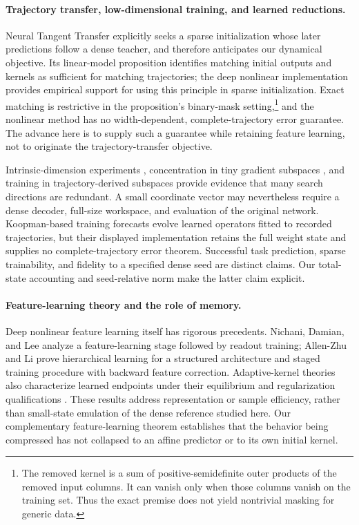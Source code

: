 \documentclass[11pt]{article}
\theoremstyle{definition}
\theoremstyle{remark}
\begin{document}
\paragraph{Trajectory transfer, low-dimensional training, and learned reductions.}
Neural Tangent Transfer \cite{liu2020transfer} explicitly seeks a sparse
initialization whose later predictions follow a dense teacher, and therefore
anticipates our dynamical objective. Its linear-model proposition identifies
matching initial outputs and kernels as sufficient for matching trajectories;
the deep nonlinear implementation provides empirical support for using this
principle in sparse initialization. Exact matching is restrictive in the
proposition's binary-mask setting,\footnote{The removed kernel is a sum of
positive-semidefinite outer products of the removed input columns. It can
vanish only when those columns vanish on the training set. Thus the exact
premise does not yield nontrivial masking for generic data.}
and the nonlinear method has no width-dependent, complete-trajectory
error guarantee. The advance here is to supply such a guarantee while
retaining feature learning, not to originate the trajectory-transfer objective.

Intrinsic-dimension experiments \cite{li2018intrinsic}, concentration in
tiny gradient subspaces \cite{gurari2018gradient}, and training in
trajectory-derived subspaces \cite{li2023trajectory} provide evidence
that many search directions are redundant. A small coordinate vector may
nevertheless require a dense decoder, full-size workspace, and evaluation of
the original network. Koopman-based training forecasts
\cite{dogra2020koopman} evolve learned operators fitted to recorded
trajectories, but their displayed implementation retains the full weight
state and supplies no complete-trajectory error theorem.
Successful task prediction, sparse trainability, and fidelity to a specified
dense seed are distinct claims. Our total-state accounting and seed-relative
norm make the latter claim explicit.

\paragraph{Feature-learning theory and the role of memory.}
Deep nonlinear feature learning itself has rigorous precedents.
Nichani, Damian, and Lee \cite{nichani2023nonlinear} analyze a
feature-learning stage followed by readout training; Allen-Zhu and Li
\cite{allenzhu2023backward} prove hierarchical learning for a structured
architecture and staged training procedure with backward feature correction.
Adaptive-kernel theories also characterize learned endpoints under their
equilibrium and regularization qualifications \cite{lauditi2025adaptive}.
These results address representation or sample efficiency, rather than
small-state emulation of the dense reference studied here. Our complementary
feature-learning theorem establishes that the behavior being compressed
has not collapsed to an affine predictor or to its own initial kernel.
\end{document}
